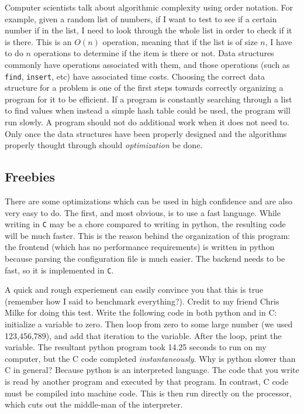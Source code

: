 Computer scientists talk about algorithmic complexity using order notation. For example, given a random list
of numbers, if I want to test to see if a certain number if in the list, I need to look through the whole
list in order to check if it is there. This is an $O(n)$ operation, meaning that if the list is of size $n$, I
have to do $n$ operations to determine if the item is there or not. Data structures commonly have operations
associated with them, and those operations (such as \texttt{find}, \texttt{insert}, etc) have associated
time costs. Choosing the correct data structure for a problem is one of the first steps towards correctly
organizing a program for it to be efficient. If a program is constantly searching through a list to find
values when instead a simple hash table could be used, the program will run slowly. A program should not
do additional work when it does not need to. Only once the data structures have been properly designed
and the algorithms properly thought through should \textit{optimization} be done.

\subsection{Freebies}

There are some optimizations which can be used in high confidence and are also very easy to do.
The first, and most obvious, is to use a fast language. While writing in \texttt{C} may be a chore
compared to writing in python, the resulting code will be much faster. This is the reason behind the
organization of this program: the frontend (which has no performance requirements) is written in
python because parsing the configuration file is much easier. The backend needs to be fast, so it
is implemented in \texttt{C}.

A quick and rough experiement can easily convince you that this is true (remember how I said to
benchmark everything?). Credit to my friend Chris Milke for doing this test. Write the following
code in both python and in C: initialize a variable to zero. Then loop from zero to some large
number (we used 123,456,789), and add that iteration to the variable. After the loop, print the
variable. The resultant python program took 14.25 seconds to run on my computer, but the C code
completed \textit{instantaneously}. Why is python slower than C in general? Because python is
an interpreted language. The code that you write is read by another program and executed by
that program. In contrast, C code must be compiled into machine code. This is then run directly
on the processor, which cuts out the middle-man of the interpreter.

